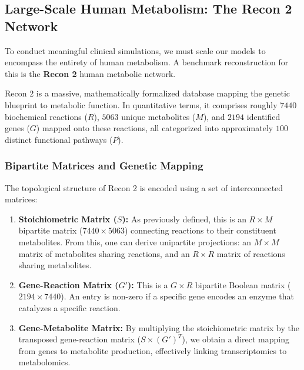 
\subsection{Large-Scale Human Metabolism: The Recon 2 Network}
\label{subsec:recon2_network}

To conduct meaningful clinical simulations, we must scale our models to encompass the entirety of human metabolism. A benchmark reconstruction for this is the \textbf{Recon 2} human metabolic network.

Recon 2 is a massive, mathematically formalized database mapping the genetic blueprint to metabolic function. In quantitative terms, it comprises roughly \(7440\) biochemical reactions (\(R\)), \(5063\) unique metabolites (\(M\)), and \(2194\) identified genes (\(G\)) mapped onto these reactions, all categorized into approximately \(100\) distinct functional pathways (\(P\)).


\subsubsection{Bipartite Matrices and Genetic Mapping}

The topological structure of Recon 2 is encoded using a set of interconnected matrices:
\begin{enumerate}
    \item \textbf{Stoichiometric Matrix (\(S\)):} As previously defined, this is an \(R \times M\) bipartite matrix (\(7440 \times 5063\)) connecting reactions to their constituent metabolites. From this, one can derive unipartite projections: an \(M \times M\) matrix of metabolites sharing reactions, and an \(R \times R\) matrix of reactions sharing metabolites.
    \item \textbf{Gene-Reaction Matrix (\(G'\)):} This is a \(G \times R\) bipartite Boolean matrix (\(2194 \times 7440\)). An entry is non-zero if a specific gene encodes an enzyme that catalyzes a specific reaction.
    \item \textbf{Gene-Metabolite Matrix:} By multiplying the stoichiometric matrix by the transposed gene-reaction matrix (\(S \times (G')^T\)), we obtain a direct mapping from genes to metabolite production, effectively linking transcriptomics to metabolomics.
\end{enumerate}

